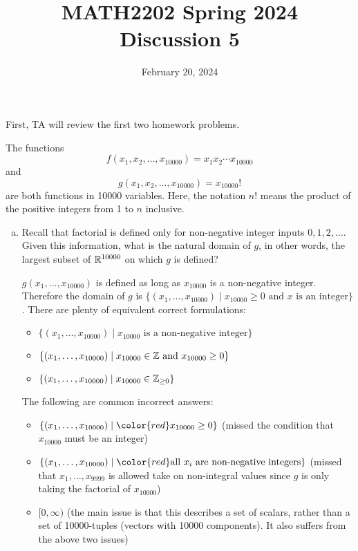 \documentclass[11pt,oneside]{amsart}
\title{MATH2202 Spring 2024\\
Discussion 5}
\date{February 20, 2024}
\theoremstyle{definition}
\begin{document}
  \maketitle
First, TA will review the first two homework problems.
  \begin{problem}
   The functions
  \[f(x_1,x_2,\dots,x_{10000})=x_1x_2\cdots x_{10000}\]
  and
  \[g(x_1,x_2,\dots,x_{10000})=x_{10000}!\]
  are both functions in 10000 variables. Here, the notation $n!$ means the product of the positive integers from 1 to $n$ inclusive.
  \begin{enumerate}[(b)]
    
    \item Recall that factorial is defined only for non-negative integer inputs $0,1,2,\dots$. Given this information, what is the natural domain of $g$, in other words, the largest subset of $\mathbb R^{10000}$ on which $g$ is defined?
    \begin{solution}
      $g(x_1,\dots,x_{10000})$ is defined as long as $x_{10000}$ is a non-negative integer. Therefore the domain of $g$ is $\{(x_1,\dots,x_{10000})\mid x_{10000}\geq 0\text{ and }x\text{ is an integer}\}$. There are plenty of equivalent correct formulations:
      \begin{itemize}
        \item $\{(x_1,\dots,x_{10000})\mid x_{10000}\text{ is a non-negative integer}\}$
        \item $\{(x_1,\dots,x_{10000})\mid x_{10000}\in\mathbb Z\text{ and }x_{10000}\geq 0\}$
        \item $\{(x_1,\dots,x_{10000})\mid x_{10000}\in\mathbb Z_{\geq 0}\}$
      \end{itemize}
      The following are common incorrect answers:
      \begin{itemize}
        \item $\{(x_1,\dots,x_{10000})\mid {\color{red}x_{10000}\geq 0}\}$ (missed the condition that $x_{10000}$ must be an integer)
        \item $\{(x_1,\dots,x_{10000})\mid {\color{red}\text{all }x_i\text{ are non-negative integers}}\}$ (missed that $x_1,\dots,x_{9999}$ is allowed take on non-integral values since $g$ is only taking the factorial of $x_{10000}$)
        \item {\color{red}$[0,\infty)$} (the main issue is that this describes a set of scalars, rather than a set of 10000-tuples (vectors with 10000 components). It also suffers from the above two issues)
      \end{itemize}


\end{solution}
\end{enumerate}
\end{problem}
\end{document}
